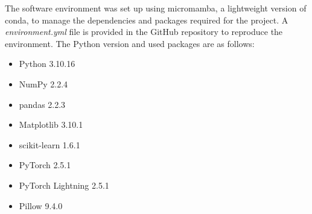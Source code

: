     The software environment was set up using micromamba, a lightweight version of conda, to manage the dependencies and packages required for the project.
    A \textit{environment.yml} file is provided in the GitHub repository to reproduce the environment.
    The Python version and used packages are as follows:

    \begin{itemize}
        \item Python 3.10.16
        \item NumPy 2.2.4
        \item pandas 2.2.3
        \item Matplotlib 3.10.1
        \item scikit-learn 1.6.1
        \item PyTorch 2.5.1
        \item PyTorch Lightning 2.5.1
        \item Pillow 9.4.0
    \end{itemize}


